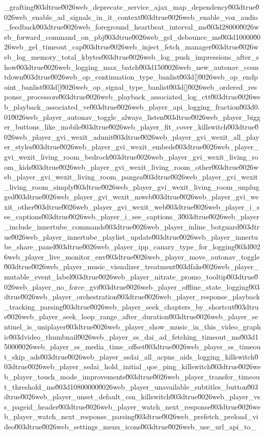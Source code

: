 {_grafting\u003dtrue\u0026web_deprecate_service_ajax_map_dependency\u003dtrue\u0026web_enable_ad_signals_in_it_context\u003dtrue\u0026web_enable_voz_audio_feedback\u003dtrue\u0026web_foreground_heartbeat_interval_ms\u003d28000\u0026web_forward_command_on_pbj\u003dtrue\u0026web_gel_debounce_ms\u003d10000\u0026web_gel_timeout_cap\u003dtrue\u0026web_inject_fetch_manager\u003dtrue\u0026web_log_memory_total_kbytes\u003dtrue\u0026web_log_push_impressions_after_show\u003dtrue\u0026web_logging_max_batch\u003d150\u0026web_new_autonav_countdown\u003dtrue\u0026web_op_continuation_type_banlist\u003d[]\u0026web_op_endpoint_banlist\u003d[]\u0026web_op_signal_type_banlist\u003d[]\u0026web_ordered_response_processors\u003dtrue\u0026web_playback_associated_log_ctt\u003dtrue\u0026web_playback_associated_ve\u003dtrue\u0026web_player_api_logging_fraction\u003d0.01\u0026web_player_autonav_toggle_always_listen\u003dtrue\u0026web_player_bigger_buttons_like_mobile\u003dtrue\u0026web_player_fit_cover_killswitch\u003dtrue\u0026web_player_gvi_wexit_adunit\u003dtrue\u0026web_player_gvi_wexit_all_player_styles\u003dtrue\u0026web_player_gvi_wexit_embeds\u003dtrue\u0026web_player_gvi_wexit_living_room_bedrock\u003dtrue\u0026web_player_gvi_wexit_living_room_kids\u003dtrue\u0026web_player_gvi_wexit_living_room_other\u003dtrue\u0026web_player_gvi_wexit_living_room_pangea\u003dtrue\u0026web_player_gvi_wexit_living_room_simply\u003dtrue\u0026web_player_gvi_wexit_living_room_unplugged\u003dtrue\u0026web_player_gvi_wexit_mweb\u003dtrue\u0026web_player_gvi_wexit_other\u003dtrue\u0026web_player_gvi_wexit_web\u003dtrue\u0026web_player_i_see_captions\u003dtrue\u0026web_player_i_see_captions_3\u003dtrue\u0026web_player_include_innertube_commands\u003dtrue\u0026web_player_inline_botguard\u003dtrue\u0026web_player_innertube_playlist_update\u003dtrue\u0026web_player_innertube_share_panel\u003dtrue\u0026web_player_ipp_canary_type_for_logging\u003d\u0026web_player_live_monitor_env\u003dtrue\u0026web_player_move_autonav_toggle\u003dtrue\u0026web_player_music_visualizer_treatment\u003dfake\u0026web_player_mutable_event_label\u003dtrue\u0026web_player_nitrate_promo_tooltip\u003dtrue\u0026web_player_no_force_gvi\u003dtrue\u0026web_player_offline_state_logging\u003dtrue\u0026web_player_orchestration\u003dtrue\u0026web_player_response_playback_tracking_parsing\u003dtrue\u0026web_player_seek_chapters_by_shortcut\u003dtrue\u0026web_player_seek_loop_range_after_duration\u003dtrue\u0026web_player_sentinel_is_uniplayer\u003dtrue\u0026web_player_show_music_in_this_video_graphic\u003dvideo_thumbnail\u0026web_player_ss_dai_ad_fetching_timeout_ms\u003d15000\u0026web_player_ss_media_time_offset\u003dtrue\u0026web_player_ss_timeout_skip_ads\u003dtrue\u0026web_player_ssdai_all_acpns_aids_logging_killswitch\u003dtrue\u0026web_player_ssdai_hold_initial_qoe_ping_killswitch\u003dtrue\u0026web_player_touch_mode_improvements\u003dtrue\u0026web_player_transfer_timeout_threshold_ms\u003d10800000\u0026web_player_unavailable_subtitles_button\u003dtrue\u0026web_player_unset_default_csn_killswitch\u003dtrue\u0026web_player_vss_pageid_header\u003dtrue\u0026web_player_watch_next_response\u003dtrue\u0026web_player_watch_next_response_parsing\u003dtrue\u0026web_prefetch_preload_video\u003dtrue\u0026web_settings_menu_icons\u003dtrue\u0026web_use_url_api_to_}
